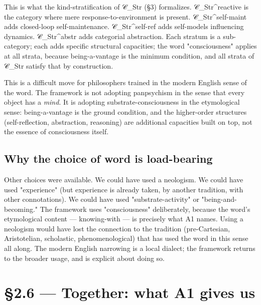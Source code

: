 \documentclass[11pt, openany]{book}
\newcommand{\sectionbreak}{\clearpage}
\begin{document}
This is what the kind-stratification of 𝒞\_\allowbreak{}Str (§3) formalizes. 𝒞\_\allowbreak{}Str\textasciicircum{}reactive is the category where mere response-to-environment is present. 𝒞\_\allowbreak{}Str\textasciicircum{}self-maint adds closed-loop self-maintenance. 𝒞\_\allowbreak{}Str\textasciicircum{}self-ref adds self-models influencing dynamics. 𝒞\_\allowbreak{}Str\textasciicircum{}abstr adds categorial abstraction. Each stratum is a sub-category; each adds specific structural capacities; the word "consciousness" applies at all strata, because being-a-vantage is the minimum condition, and all strata of 𝒞\_\allowbreak{}Str satisfy that by construction.

This is a difficult move for philosophers trained in the modern English sense of the word. The framework is not adopting panpsychism in the sense that every object has a \textit{mind}. It is adopting substrate-consciousness in the etymological sense: being-a-vantage is the ground condition, and the higher-order structures (self-reflection, abstraction, reasoning) are additional capacities built on top, not the essence of consciousness itself.

\subsection{Why the choice of word is load-bearing}

Other choices were available. We could have used a neologism. We could have used "experience" (but experience is already taken, by another tradition, with other connotations). We could have used "substrate-activity" or "being-and-becoming." The framework uses "consciousness" deliberately, because the word's etymological content --- knowing-with --- is precisely what A1 names. Using a neologism would have lost the connection to the tradition (pre-Cartesian, Aristotelian, scholastic, phenomenological) that has used the word in this sense all along. The modern English narrowing is a local dialect; the framework returns to the broader usage, and is explicit about doing so.

\sectionbreak

\section{§2.6 --- Together: what A1 gives us}
\end{document}

